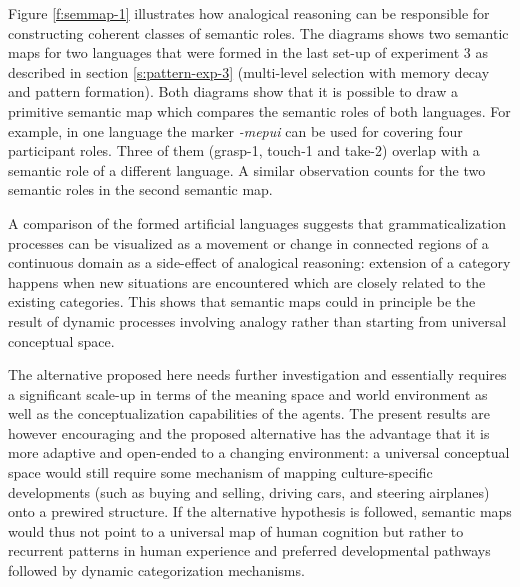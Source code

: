 Figure \ref{f:semmap-1} illustrates how analogical reasoning can be responsible for constructing coherent classes of semantic roles. The diagrams shows two semantic maps for two languages that were formed in the last set-up of experiment 3 as described in section \ref{s:pattern-exp-3} (multi-level selection with memory decay and pattern formation). Both diagrams show that it is possible to draw a primitive semantic map which compares the semantic roles of both languages. For example, in one language the marker {\em -mepui} can be used for covering four participant roles. Three of them (grasp-1, touch-1 and take-2) overlap with a semantic role of a different language. A similar observation counts for the two semantic roles in the second semantic map.

A comparison of the formed artificial languages suggests that grammaticalization processes can be visualized as a movement or change in connected regions of a continuous domain as a side-effect of analogical reasoning: extension of a category happens when new situations are encountered which are closely related to the existing categories. This shows that semantic maps could in principle be the result of dynamic processes involving analogy rather than starting from universal conceptual space.

The alternative proposed here needs further investigation and essentially requires a significant scale-up in terms of the meaning space and world environment as well as the conceptualization capabilities of the agents. The present results are however encouraging and the proposed alternative has the advantage that it is more adaptive and open-ended to a changing environment: a universal conceptual space would still require some mechanism of mapping culture-specific developments (such as buying and selling, driving cars, and steering airplanes) onto a prewired structure. If the alternative hypothesis is followed, semantic maps would thus not point to a universal map of human cognition but rather to recurrent patterns in human experience and preferred developmental pathways followed by dynamic categorization mechanisms.


